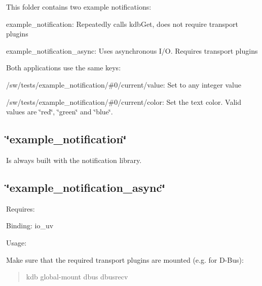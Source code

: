 This folder contains two example notifications\+:


\begin{DoxyItemize}
\item example\+\_\+notification\+: Repeatedly calls kdb\+Get, does not require transport plugins
\item example\+\_\+notification\+\_\+async\+: Uses asynchronous I/O. Requires transport plugins
\end{DoxyItemize}

Both applications use the same keys\+:


\begin{DoxyItemize}
\item /sw/tests/example\+\_\+notification/\#0/current/value\+: Set to any integer value
\item /sw/tests/example\+\_\+notification/\#0/current/color\+: Set the text color. Valid values are \char`\"{}red\char`\"{}, \char`\"{}green\char`\"{} and \char`\"{}blue\char`\"{}.
\end{DoxyItemize}

\subsection*{\char`\"{}example\+\_\+notification\char`\"{}}

Is always built with the notification library.

\subsection*{\char`\"{}example\+\_\+notification\+\_\+async\char`\"{}}

Requires\+:


\begin{DoxyItemize}
\item Binding\+: {\ttfamily io\+\_\+uv}
\end{DoxyItemize}

Usage\+:

Make sure that the required transport plugins are mounted (e.\+g. for D-\/\+Bus)\+:

\begin{quote}
kdb global-\/mount dbus dbusrecv\end{quote}
